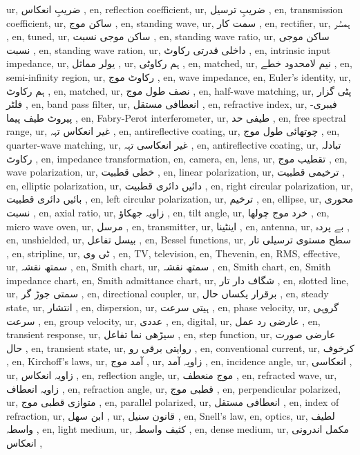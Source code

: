 ur, ضریبِ انعکاس ,
en, reflection coefficient,
ur, ضریبِ ترسیل ,
en, transmission coefficient,
ur, ساکن موج ,
en, standing wave,
ur, سمت کار ,
en, rectifier,
ur, ہمسُر ,
en, tuned,
ur, ساکن موجی نسبت ,
en, standing wave ratio,
ur, ساکن موجی نسبت ,
en, standing wave ration,
ur, داخلی قدرتی رکاوٹ ,
en, intrinsic input impedance,
ur, یولر مماثل ,
ur, ہم رکاوٹی ,
en, matched,
ur, نیم لامحدود خطے ,
en, semi-infinity region,
ur, رکاوٹ موج ,
en, wave impedance,
en, Euler's identity,
ur, ہم رکاوٹ ,
en, matched,
ur, نصف طول موج ,
en, half-wave matching,
ur, پٹی گزار فلٹر ,
en, band pass filter,
ur, انعطافی مستقل ,
en, refractive index,
ur, فیبری-پیروٹ طیف پیما ,
en, Fabry-Perot interferometer,
ur, طیفی حد ,
en, free spectral range,
ur, غیر انعکاس تہہ ,
en, antireflective coating,
ur, چوتھائی طول موج ,
en, quarter-wave matching,
ur, غیر انعکاسی تہہ ,
en, antireflective coating,
ur, تبادلہ رکاوٹ ,
en, impedance transformation,
en, camera,
en, lens,
ur, تقطیب موج ,
en, wave polarization,
ur, خطی قطبیت ,
en, linear polarization,
ur, ترخیمی قطبیت ,
en, elliptic polarization,
ur, دائیں دائری قطبیت ,
en, right circular polarization,
ur, بائیں دائری قطبیت ,
en, left circular polarization,
ur, ترخیم ,
en, ellipse,
ur, محوری نسبت ,
en, axial ratio,
ur, زاویہ جھکاؤ ,
en, tilt angle,
ur, خرد موج چولھا ,
en, micro wave oven,
ur, مرسل ,
en, transmitter,
ur, اینٹینا ,
en, antenna,
ur, بے پردہ ,
en, unshielded,
ur, بیسل تفاعل ,
en, Bessel functions,
ur, سطح مستوی ترسیلی تار ,
en, stripline,
ur, ٹی وی ,
en, TV, television,
en, Thevenin,
en, RMS, effective,
ur, سمتھ نقشہ ,
en, Smith chart,
ur, سمتھ نقشہ ,
en, Smith chart,
en, Smith impedance chart,
en, Smith admittance chart,
ur, شگاف دار تار ,
en, slotted line,
ur, سمتی جوڑ گر ,
en, directional coupler,
ur, برقرار یکساں حال ,
en, steady state,
ur, انتشار ,
en, dispersion,
ur, ہیتی سرعت ,
en, phase velocity,
ur, گروہی سرعت ,
en, group velocity,
ur, عددی ,
en, digital,
ur, عارضی رد عمل ,
en, transient response,
ur, سیڑھی نما تفاعل ,
en, step function,
ur, عارضی صورت حال ,
en, transient state,
ur, روایتی برقی رو ,
en, conventional current,
ur, کرخوف ,
en, Kirchoff's laws,
ur, آمد موج ,
ur, زاویہ آمد ,
en, incidence angle,
ur, انعکاسی ,
ur, زاویہ انعکاس ,
en, reflection angle,
ur, موج منعطف ,
en, refracted wave,
ur, زاویہ انعطاف ,
en, refraction angle,
ur,  قطبی موج ,
en, perpendicular polarized,
ur, متوازی قطبی موج ,
en, parallel polarized,
ur, انعطافی مستقل ,
en, index of refraction,
ur, ابن سھل ,
ur, قانون سنیل ,
en, Snell's law,
en, optics,
ur, لطیف واسطہ ,
en, light medium,
ur, کثیف واسطہ ,
en, dense medium,
ur, مکمل اندرونی انعکاس ,
